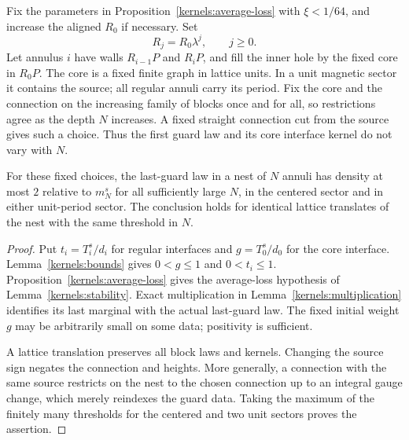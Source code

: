 Fix the parameters in Proposition~\ref{kernels:average-loss} with
\(\xi<1/64\), and increase the aligned \(R_0\) if necessary. Set
\[
                 R_j=R_0\lambda^j,\qquad j\ge0.
\]
Let annulus \(i\) have walls \(R_{i-1}P\) and \(R_iP\), and fill
the inner hole by the fixed core in \(R_0P\). The core is a fixed
finite graph in lattice units. In a unit magnetic sector it
contains the source; all regular annuli carry its period.
Fix the core and the connection on the increasing family of blocks
once and for all, so restrictions agree as the depth \(N\) increases.
A fixed straight connection cut from the source gives such a choice.
Thus the first guard law and its core interface kernel do not vary
with \(N\).

\begin{corollary}\label{kernels:last-guard}
For these fixed choices, the last-guard law in a nest of \(N\)
annuli has density at most \(2\) relative to \(m_N^s\) for all
sufficiently large \(N\), in the centered sector and in either
unit-period sector. The conclusion holds for identical lattice
translates of the nest with the same threshold in \(N\).
\end{corollary}

\begin{proof}
Put \(t_i=T_i^s/d_i\) for regular interfaces and
\(g=T_0^s/d_0\) for the core interface. Lemma~\ref{kernels:bounds}
gives \(0<g\le1\) and \(0<t_i\le1\).
Proposition~\ref{kernels:average-loss} gives the average-loss
hypothesis of Lemma~\ref{kernels:stability}.
Exact multiplication in Lemma~\ref{kernels:multiplication}
identifies its last marginal with the actual last-guard law.
The fixed initial weight \(g\) may be arbitrarily small on some
data; positivity is sufficient.

A lattice translation preserves all block laws and kernels.
Changing the source sign negates the connection and heights.
More generally, a connection with the same source restricts on
the nest to the chosen connection up to an integral gauge change,
which merely reindexes the guard data. Taking the maximum of the
finitely many thresholds for the centered and two unit sectors
proves the assertion.
\end{proof}
